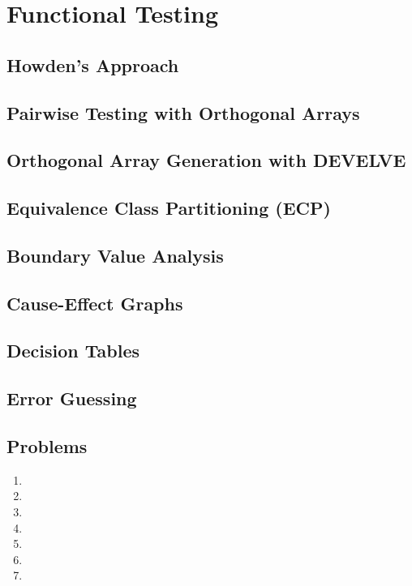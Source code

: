 \setchapterpreamble[u]{\margintoc}
\chapter{Functional Testing}
\section{Howden’s Approach}
\section{Pairwise Testing with Orthogonal Arrays}
\section{Orthogonal Array Generation with DEVELVE}
\section{Equivalence Class Partitioning (ECP)}
\section{Boundary Value Analysis}
\section{Cause-Effect Graphs}
\section{Decision Tables}
\section{Error Guessing}
\section{Problems}
\begin{enumerate}
    \item 
    \item 
    \item 
    \item 
    \item 
    \item
    \item 
\end{enumerate}
